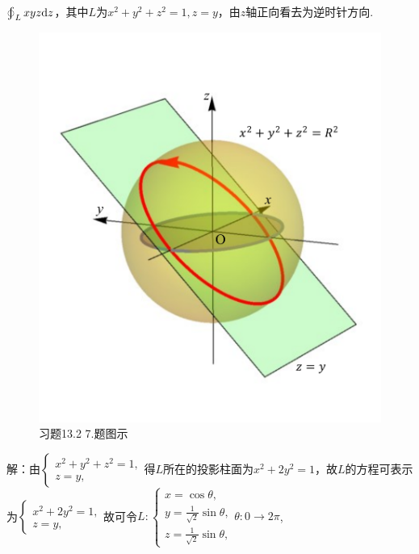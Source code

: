 \documentclass[12pt,UTF8]{ctexart}
\newcommand{\BLOInt}[2]{\varoint\nolimits_{#1}#2}
\begin{document}
\begin{enumerate}
$\BLOInt L{xyz\mathrm dz}$，其中$L$为$x^2+y^2+z^2=1,z=y$，由$z$轴正向看去为逆时针方向.

\begin{figure}[H]
\begin{center}
\includegraphics[height=0.7\textheight]{Figures22/Fig13-2-7.pdf}
\end{center}
\caption{习题13.2 7.题图示}
\label{13-2-7}
\end{figure}

解：由$\begin{cases}
x^2+y^2+z^2=1,\\
z=y,
\end{cases}$得$L$所在的投影柱面为$x^2+2y^2=1$，故$L$的方程可表示为$\begin{cases}
x^2+2y^2=1,\\
z=y,
\end{cases}$故可令$L:\begin{cases}
x=\cos\theta,\\
y=\frac1{\sqrt2}\sin\theta,\\
z=\frac1{\sqrt2}\sin\theta,
\end{cases}\theta:0\rightarrow2\pi$,


\end{enumerate}
\end{document}
